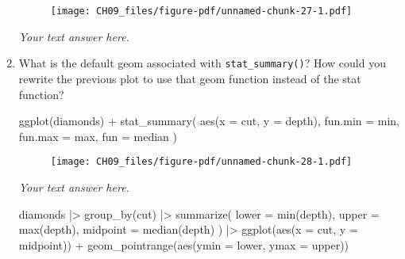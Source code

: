 \documentclass[
  letterpaper,
  DIV=11,
  numbers=noendperiod]{scrreprt}
\newenvironment{Shaded}{\begin{snugshade}}{\end{snugshade}}
\newcommand{\AttributeTok}[1]{\textcolor[rgb]{0.40,0.45,0.13}{#1}}
\newcommand{\FunctionTok}[1]{\textcolor[rgb]{0.28,0.35,0.67}{#1}}
\newcommand{\NormalTok}[1]{\textcolor[rgb]{0.00,0.23,0.31}{#1}}
\newcommand{\SpecialCharTok}[1]{\textcolor[rgb]{0.37,0.37,0.37}{#1}}
\begin{document}
\begin{enumerate}
\begin{tcolorbox}
\begin{figure}[H]
  {\centering \texttt{[image: CH09\_files/figure-pdf/unnamed-chunk-27-1.pdf]}

  }

  \end{figure}

  \emph{Your text answer here.}

  \end{tcolorbox}
\item
  What is the default geom associated with \texttt{stat\_summary()}? How
  could you rewrite the previous plot to use that geom function instead
  of the stat function?

\begin{Shaded}
\begin{Highlighting}[]
\FunctionTok{ggplot}\NormalTok{(diamonds) }\SpecialCharTok{+} 
  \FunctionTok{stat\_summary}\NormalTok{(}
    \FunctionTok{aes}\NormalTok{(}\AttributeTok{x =}\NormalTok{ cut, }\AttributeTok{y =}\NormalTok{ depth),}
    \AttributeTok{fun.min =}\NormalTok{ min,}
    \AttributeTok{fun.max =}\NormalTok{ max,}
    \AttributeTok{fun =}\NormalTok{ median}
\NormalTok{  )}
\end{Highlighting}
\end{Shaded}

  \begin{figure}[H]

  {\centering \texttt{[image: CH09\_files/figure-pdf/unnamed-chunk-28-1.pdf]}

  }

  \end{figure}

  \begin{tcolorbox}[enhanced jigsaw, left=2mm, rightrule=.15mm, bottomtitle=1mm, opacitybacktitle=0.6, leftrule=.75mm, opacityback=0, colframe=quarto-callout-note-color-frame, bottomrule=.15mm, coltitle=black, toptitle=1mm, colback=white, titlerule=0mm, colbacktitle=quarto-callout-note-color!10!white, title={Answer}, toprule=.15mm, breakable, arc=.35mm]

  \emph{Your text answer here.}

\begin{Shaded}
\begin{Highlighting}[]
\NormalTok{diamonds }\SpecialCharTok{|\textgreater{}}
  \FunctionTok{group\_by}\NormalTok{(cut) }\SpecialCharTok{|\textgreater{}}
  \FunctionTok{summarize}\NormalTok{(}
    \AttributeTok{lower =} \FunctionTok{min}\NormalTok{(depth),}
    \AttributeTok{upper =} \FunctionTok{max}\NormalTok{(depth),}
    \AttributeTok{midpoint =} \FunctionTok{median}\NormalTok{(depth)}
\NormalTok{  ) }\SpecialCharTok{|\textgreater{}}
  \FunctionTok{ggplot}\NormalTok{(}\FunctionTok{aes}\NormalTok{(}\AttributeTok{x =}\NormalTok{ cut, }\AttributeTok{y =}\NormalTok{ midpoint)) }\SpecialCharTok{+}
  \FunctionTok{geom\_pointrange}\NormalTok{(}\FunctionTok{aes}\NormalTok{(}\AttributeTok{ymin =}\NormalTok{ lower, }\AttributeTok{ymax =}\NormalTok{ upper))}
\end{Highlighting}
\end{Shaded}


\end{tcolorbox}
\end{enumerate}
\end{document}
